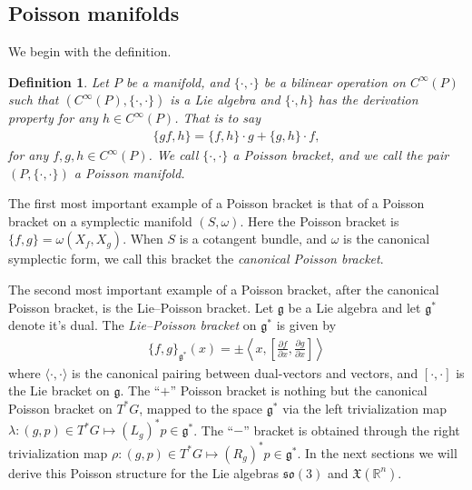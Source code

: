 \documentclass[12pt]{amsart}
\newcommand{\pder}[2]{\ensuremath{\frac{\partial #1}{\partial #2}}}
\newcommand{\so}{\ensuremath{\mathfrak{so}}}
\newtheorem{defn}[thm]{Definition}
\begin{document}
\subsection{Poisson manifolds}
\label{sec:Poisson}
We begin with the definition.

\begin{defn} \label{defn:Poisson}
  Let $P$ be a manifold, and $\{ \cdot , \cdot \}$ be a bilinear
  operation on $C^{\infty}(P)$ such that 
  $( C^{\infty}(P) , \{ \cdot , \cdot \} )$ is a Lie algebra
  and $\{ \cdot , h \}$ has the derivation property for any $h \in C^{\infty}(P)$.
  That is to say
  \begin{align*}
    \{ gf , h \} = \{ f , h \} \cdot g + \{ g , h \} \cdot f,
  \end{align*}
  for any $f,g,h \in C^{\infty}(P)$.
  We call $\{ \cdot , \cdot \}$ a \emph{Poisson bracket},
  and we call the pair $(P, \{ \cdot , \cdot \})$ a Poisson manifold.
\end{defn}

The first most important example of a Poisson bracket is
that of a Poisson bracket on a symplectic manifold $(S,\omega)$.
Here the Poisson bracket is $\{ f , g \} = \omega( X_f , X_g )$.
When $S$ is a cotangent bundle, and $\omega$ is the canonical
symplectic form, we call this bracket the \emph{canonical Poisson
bracket}.

The second most important example of a Poisson bracket,
after the canonical Poisson bracket,
is the Lie--Poisson bracket.  Let $\mathfrak{g}$ be a Lie algebra
and let $\mathfrak{g}^*$ denote it's dual.
The \emph{Lie--Poisson bracket} on $\mathfrak{g}^*$ is given 
by
\begin{align}
  \{ f , g \}_{\mathfrak{g}^*}( x ) = \pm
  \left \langle x , \left[ \pder{f}{x} , \pder{g}{x} \right] \right \rangle
  \label{eq:Lie-Poisson}
\end{align}
where $\langle \cdot , \cdot \rangle$ is the canonical pairing between
dual-vectors and vectors, and $[ \cdot , \cdot ]$ is the Lie bracket
on $\mathfrak{g}$.
The ``$+$'' Poisson bracket is nothing but the canonical Poisson bracket on $T^*G$,
mapped to the space $\mathfrak{g}^*$ via the left trivialization map $\lambda: (g,p) \in T^*G \mapsto (L_g)^*p \in \mathfrak{g}^*$.
The ``$-$'' bracket is obtained through the right trivialization map
$\rho:(g,p) \in T^*G \mapsto (R_g)^*p \in \mathfrak{g}^*$.
In the next sections we will derive this Poisson structure for the 
Lie algebras $\so(3)$ and $\mathfrak{X}(\mathbb{R}^n)$.
\end{document}
